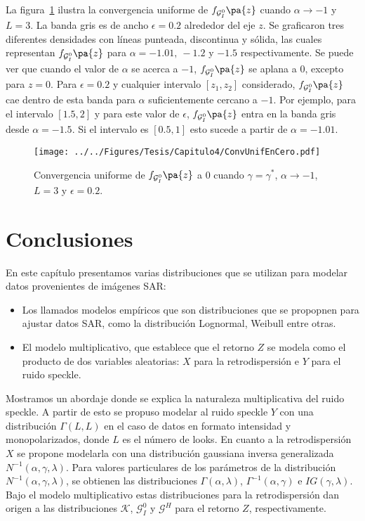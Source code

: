 La figura~\ref{ConvEnCero} ilustra la convergencia uniforme de $f_{\mathcal{G}_I^0}\pa{z}$ cuando $\alpha \to -1$ y $L=3$. La banda gris es de ancho $\epsilon=0.2$ alrededor del eje $z$. 
Se graficaron tres diferentes densidades con líneas punteada, discontinua y sólida, las cuales representan $f_{\mathcal{G}_I^0}\pa{z}$ para $\alpha=-1.01, \ -1.2$ y $-1.5$ respectivamente. 
Se puede ver que cuando el valor de $\alpha$ se acerca a $-1$, $f_{\mathcal{G}_I^0}\pa{z}$ se aplana a $0$, excepto para $z=0$. 
Para  $\epsilon=0.2$ y cualquier intervalo $[z_1,z_2]$ considerado, $f_{\mathcal{G}_I^0}\pa{z}$ cae dentro de esta banda para $\alpha$ suficientemente cercano a $-1$. 
Por ejemplo, para el intervalo $[1.5,2]$ y para este valor de $\epsilon$, $f_{\mathcal{G}_I^0}\pa{z}$ entra en la banda gris desde $\alpha=-1.5$. 
Si el intervalo es $[0.5,1]$ esto sucede a partir de $\alpha=-1.01$.



\begin{figure}[hbt]
	\centering    
	\texttt{[image: ../../Figures/Tesis/Capitulo4/ConvUnifEnCero.pdf]}
	\caption{\label{ConvEnCero}Convergencia uniforme de $f_{\mathcal{G}_I^0}\pa{z}$ a $0$ cuando $\gamma=\gamma^*$, $\alpha \to -1$, $L=3$ y $\epsilon=0.2$.}
\end{figure}

\section{Conclusiones}

En este capítulo presentamos varias distribuciones que se utilizan para modelar datos provenientes de imágenes SAR:
\begin{itemize}
	\item Los llamados modelos empíricos que son distribuciones que se propopnen para ajustar datos SAR, como la distribución Lognormal, Weibull entre otras.
	\item El modelo multiplicativo, que establece que el retorno $Z$ se modela como el producto de dos variables aleatorias: $X$ para la retrodispersión e $Y$ para el ruido speckle.
\end{itemize} 

Mostramos un abordaje donde se explica la naturaleza multiplicativa del ruido speckle. A partir de esto se propuso modelar al ruido speckle $Y$ con una distribución $\Gamma(L,L)$ en el caso de datos en formato intensidad y monopolarizados, donde $L$ es el número de looks. En cuanto a la retrodispersión $X$ se propone modelarla con una distribución gaussiana inversa generalizada $N^{-1}(\alpha,\gamma,\lambda)$. Para valores particulares de los parámetros de la distribución $N^{-1}(\alpha,\gamma,\lambda)$, se obtienen las distribuciones $\Gamma(\alpha,\lambda)$, $\Gamma^{-1}(\alpha,\gamma)$ e $IG(\gamma, \lambda)$. Bajo el modelo multiplicativo estas distribuciones para la retrodispersión dan origen a las distribuciones $\mathcal{K}$, $\mathcal{G}_I^0$ y $\mathcal{G}^H$ para el retorno $Z$, respectivamente. 

